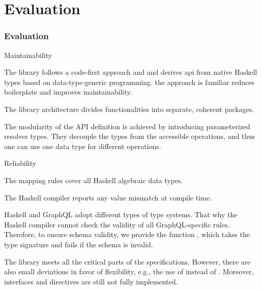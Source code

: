 \section{Evaluation}

\begin{frame}[allowframebreaks]\frametitle{Evaluation}

\begin{block}{Maintainability}

  \begin{itemize}
  
     The library follows a code-first approach and and derives api from native Haskell types based on data-type-generic programming. the approach is familiar reduces boilerplate and improves maintainability.

      The library architecture divides functionalities into separate, coherent packages. 
    
      The modularity of the API definition is achieved by introducing parameterized resolver types. They decouple the types from the accessible operations, and thus one can use one data type for different operations.

  \end{itemize}

\end{block}


\begin{block}{Reliability}

\begin{itemize}

    \begin{enumerate}

       The mapping rules cover all Haskell algebraic data types.

       The Haskell compiler reports any value mismatch at compile time.
      
       Haskell and GraphQL adopt different types of type systems. That why the Haskell compiler cannot check the validity of all GraphQL-specific rules. Therefore, to ensure schema validity, we provide the function , which takes the  type signature and fails if the schema is invalid.
    
    \end{enumerate}

   The library meets all the critical parts of the specifications. However, there are also small deviations in favor of flexibility, e.g., the use of  instead of . Moreover, interfaces and directives are still not fully implemented. 


\end{itemize}
\end{block}
\end{frame}
